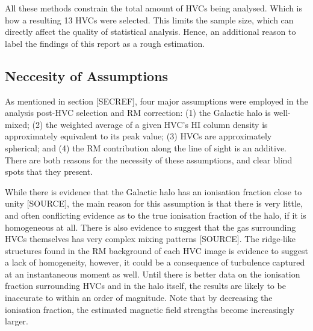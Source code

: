 All these methods constrain the total amount of HVCs being analysed. Which is how a resulting 13 HVCs were selected. This limits the sample size, which can directly affect the quality of statistical analysis. Hence, an additional reason to label the findings of this report as a rough estimation.

\subsection{Neccesity of Assumptions}
\label{ssec:B2}

As mentioned in section [SECREF], four major assumptions were employed in the analysis post-HVC selection and RM correction: (1) the Galactic halo is well-mixed; (2) the weighted average of a given HVC's HI column density is approximately equivalent to its peak value; (3) HVCs are approximately spherical; and (4) the RM contribution along the line of sight is an additive. There are both reasons for the necessity of these assumptions, and clear blind spots that they present.


While there is evidence that the Galactic halo has an ionisation fraction close to unity [SOURCE], the main reason for this assumption is that there is very little, and often conflicting evidence as to the true ionisation fraction of the halo, if it is homogeneous at all. There is also evidence to suggest that the gas surrounding HVCs themselves has very complex mixing patterns [SOURCE]. The ridge-like structures found in the RM background of each HVC image is evidence to suggest a lack of homogeneity, however, it could be a consequence of turbulence captured at an instantaneous moment as well. Until there is better data on the ionisation fraction surrounding HVCs and in the halo itself, the results are likely to be inaccurate to within an order of magnitude. Note that by decreasing the ionisation fraction, the estimated magnetic field strengths become increasingly larger.



